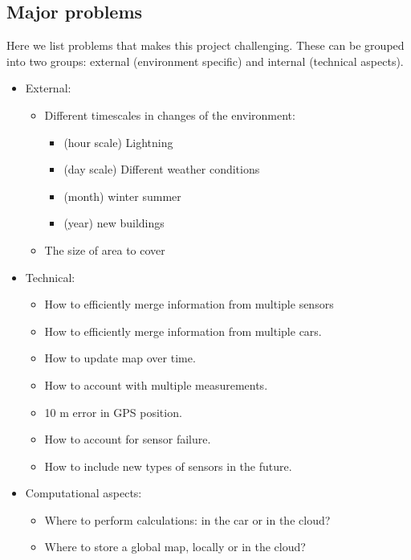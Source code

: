 \subsection{Major problems}
Here we list problems that makes this project challenging. These can
be grouped into two groups: external (environment specific) and
internal (technical aspects).
\begin{itemize}
\item External:
  \begin{itemize}
  \item Different timescales in changes of the environment:
    \begin{itemize}
    \item (hour scale) Lightning
    \item (day scale) Different weather conditions
    \item (month) winter summer
    \item (year) new buildings
    \end{itemize}
  \item The size of area to cover
  \end{itemize}
\item Technical:
  \begin{itemize}
  \item  How to efficiently merge information from multiple
    sensors
  \item  How to efficiently merge information from multiple cars.
  \item  How to update map over time.
  \item How to account with multiple measurements.
  \item  10 m error in GPS position.
  \item  How to account for sensor failure.
  \item  How to include new types of sensors in the future.
  \end{itemize}
\item  Computational aspects:
  \begin{itemize}
  \item   Where to perform calculations: in the car or in the
    cloud?
  \item   Where to store a global map, locally or in the cloud?
 \end{itemize}
\end{itemize}


